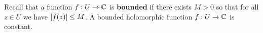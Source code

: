 \documentclass{homework}
\begin{document}
                                                                                                                                                                                                                                                    \begin{problem}\label{liouville-theorem}Recall that a function $f : U \to \mathbb{C}$ is
                                                                                                                                                                                                                                                      \textbf{bounded} if there exists $M > 0$ so that for all $z \in U$
                                                                                                                                                                                                                                                        we have $\left|f(z)\right| \leq M$.  A bounded holomorphic function
                                                                                                                                                                                                                                                          $f : U \to \mathbb{C}$ is constant.
                                                                                                                                                                                                                                                          \end{problem}
\end{document}
